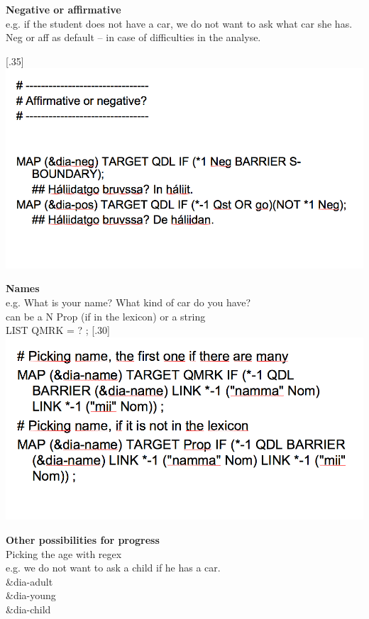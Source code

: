 \documentclass[landscape,norsk,11pt]{seminar}
\begin{document}
\begin{slide}
\newslide
\textbf{Negative or affirmative} \\
e.g. if the student does not have a car, we do not want to ask what car she has. \\
Neg or aff as default -- in case of difficulties in the analyse.

\newslide
\textbf{}
\scalebox{.35}[.35]{\includegraphics{img/aff_or_neg.png}}


\newslide
\textbf{Names}\\
e.g. What is your name? What kind of car do you have?\\
can be a N Prop (if in the lexicon) or a string \\ LIST QMRK = ? ; 
\scalebox{.30}[.30]{\includegraphics{img/picking_name.png}}

\newslide
\textbf{Other possibilities for progress}\\
Picking the age with regex \\
e.g. we do not want to ask a child if he has a car. \\

\&dia-adult \\
\&dia-young \\
\&dia-child









\end{slide}
\end{document}
